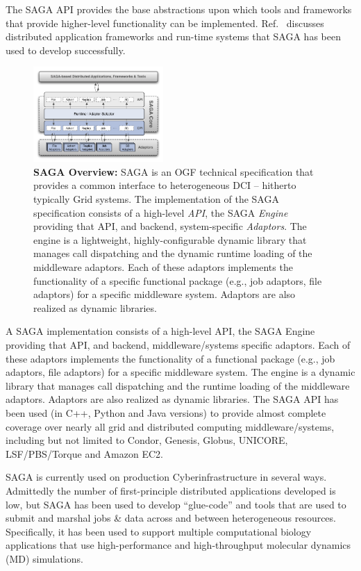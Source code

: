 \documentclass{sig-alternate}
\begin{document}
The SAGA API provides the base abstractions upon which tools and
frameworks that provide higher-level functionality can be
implemented. Ref.~\cite{saga_url} discusses distributed application
frameworks and run-time systems that SAGA has been used to develop
successfully. 

\begin{figure}[t]
\centering
\includegraphics[width=0.44\textwidth]{./figs/saga-architecture-1}
\caption{\textbf{SAGA Overview: } SAGA is an OGF technical
  specification that provides a common interface to heterogeneous DCI
  -- hitherto typically Grid systems.  The implementation of the
  SAGA\cite{saga_url} specification consists of a high-level {\it
    API}, the SAGA {\it Engine} providing that API, and backend,
  system-specific {\it Adaptors}.  The engine is a lightweight,
  highly-configurable dynamic library that manages call dispatching
  and the dynamic runtime loading of the middleware adaptors.  Each of
  these adaptors implements the functionality of a specific functional
  package (e.g., job adaptors, file adaptors) for a specific
  middleware system. Adaptors are also realized as dynamic libraries.}
 \label{fig:saga-overview}
\end{figure}

A SAGA implementation consists of a high-level API, the SAGA
Engine providing that API, and backend, middleware/systems specific
adaptors. Each of these adaptors implements the functionality of
a functional package (e.g., job adaptors, file adaptors) for a
specific middleware system. The engine is a dynamic library that
manages call dispatching and the runtime loading of the middleware
adaptors. Adaptors are also realized as dynamic libraries. The SAGA
API has been used (in C++, Python and Java versions) to provide almost
complete coverage over nearly all grid and distributed computing
middleware/systems, including but not limited to Condor, Genesis,
Globus, UNICORE, LSF/PBS/Torque and Amazon EC2.

SAGA is currently used on production Cyberinfrastructure in several
ways.  Admittedly the number of first-principle distributed
applications developed is low, but SAGA has been used to develop
``glue-code'' and tools that are used to submit and marshal jobs \&
data across and between heterogeneous resources. Specifically, it has
been used to support multiple computational biology applications that
use high-performance and high-throughput molecular dynamics (MD)
simulations.
\end{document}

